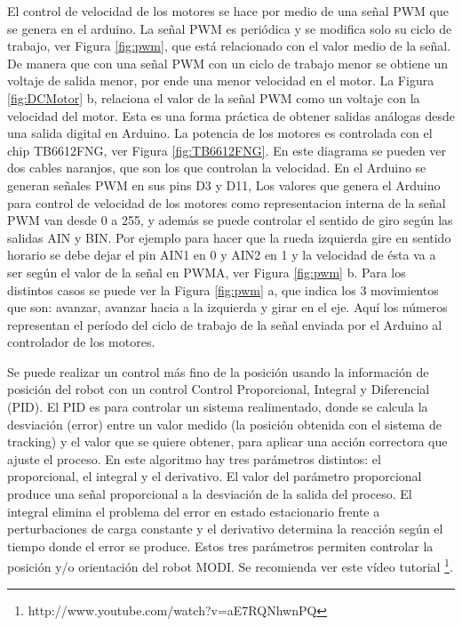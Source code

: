El control de velocidad de los motores se hace por medio de una señal PWM que se genera en el arduino. La señal PWM es periódica y se modifica solo su ciclo de trabajo, ver Figura \ref{fig:pwm}, que está relacionado con el valor medio de la señal. De manera que con una señal PWM con un ciclo de trabajo menor se obtiene un voltaje de salida menor, por ende una menor velocidad en el motor.  La Figura \ref{fig:DCMotor} b, relaciona el valor de la señal PWM como un voltaje con la velocidad del motor. Esta es una forma práctica de obtener salidas análogas desde una salida digital en Arduino. 
La potencia de los motores es controlada con el chip TB6612FNG, ver Figura \ref{fig:TB6612FNG}. En este diagrama se pueden ver dos cables naranjos, que son los que controlan la velocidad. En el Arduino se generan señales PWM en sus pins D3 y D11, Los valores que genera el Arduino para control de velocidad de los motores como representacion interna de la señal PWM van desde 0 a 255, y además se puede controlar el sentido de giro según las salidas AIN y BIN. Por ejemplo para hacer que la rueda izquierda gire en sentido horario se debe dejar el pin AIN1 en 0 y AIN2 en 1 y la velocidad de ésta va a ser según el valor de la señal en PWMA, ver Figura \ref{fig:pwm} b. Para los distintos casos se puede ver la Figura \ref{fig:pwm} a, que indica los 3 movimientos que son: avanzar, avanzar hacia a la izquierda y girar en el eje. Aquí los números representan el período del ciclo de trabajo de la señal enviada por el Arduino al controlador de los motores. 

Se puede realizar un control más fino de la posición usando la información de posición del robot con un control Control Proporcional, Integral y Diferencial (PID). El PID es para controlar un sistema realimentado, donde se calcula la desviación (error) entre un valor medido (la posición obtenida con el sistema de tracking) y el valor que se quiere obtener, para aplicar una acción correctora que ajuste el proceso. En este algoritmo hay tres parámetros distintos: el proporcional, el integral y el derivativo. El valor del parámetro proporcional produce una señal proporcional a la desviación de la salida del proceso. El integral elimina el problema del error en estado estacionario frente a perturbaciones de carga constante y el derivativo determina la reacción según el tiempo donde el error se produce. Estos tres parámetros permiten controlar la posición y/o orientación del robot MODI. Se recomienda ver este vídeo tutorial \footnote{http://www.youtube.com/watch?v=aE7RQNhwnPQ}. 

